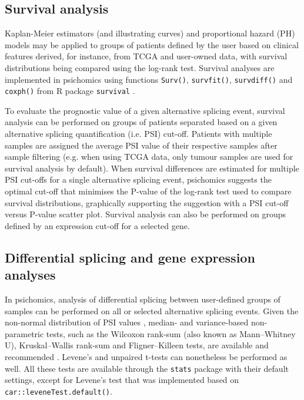 \subsection{Survival analysis}

Kaplan-Meier estimators (and illustrating curves) \cite{rich:2010wt} and proportional hazard (PH) models \cite{spruance:2004vn} may be applied to groups of patients defined by the user based on clinical features derived, for instance, from TCGA and user-owned data, with survival distributions being compared using the log-rank test. Survival analyses are implemented in psichomics using functions \texttt{Surv()}, \texttt{survfit()}, \texttt{survdiff()} and \texttt{coxph()} from R package \texttt{survival} \cite{therneau:2000tk}.

To evaluate the prognostic value of a given alternative splicing event, survival analysis can be performed on groups of patients separated based on a given alternative splicing quantification (i.e. PSI) cut-off. Patients with multiple samples are assigned the average PSI value of their respective samples after sample filtering (e.g. when using TCGA data, only tumour samples are used for survival analysis by default). When survival differences are estimated for multiple PSI cut-offs for a single alternative splicing event, psichomics suggests the optimal cut-off that minimises the P-value of the log-rank test used to compare survival distributions, graphically supporting the suggestion with a PSI cut-off versus P-value scatter plot. Survival analysis can also be performed on groups defined by an expression cut-off for a selected gene.

\subsection{Differential splicing and gene expression analyses}

In psichomics, analysis of differential splicing between user-defined groups of samples can be performed on all or selected alternative splicing events. Given the non-normal distribution of PSI values \cite{kakaradov:2012wk,jia:2015wy}, median- and variance-based non-parametric tests, such as the Wilcoxon rank-sum (also known as Mann–Whitney U), Kruskal–Wallis rank-sum and Fligner–Killeen tests, are available and recommended \cite{caravela:2015vk}. Levene's and unpaired t-tests can nonetheless be performed as well. All these tests are available through the \texttt{stats} package with their default settings, except for Levene's test that was implemented based on \texttt{car::leveneTest.default()}.

